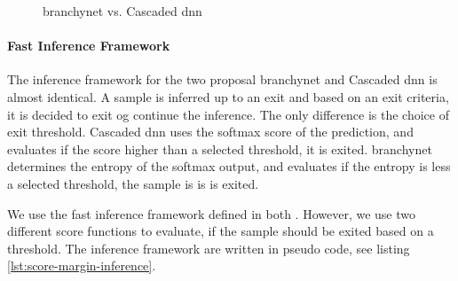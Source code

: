 \begin{figure}
	\hspace{2em}
	\caption[\gls{branchynet} vs. Cascaded \gls{dnn}]{\gls{branchynet} vs. Cascaded \gls{dnn}}
	\label{fig:cascaded-vs-branchy}
\end{figure}

\paragraph{Fast Inference Framework} The inference framework for the two proposal \gls{branchynet} and Cascaded \gls{dnn} is almost identical. A sample is inferred up to an exit and based on an exit criteria, it is decided to exit og continue the inference. The only difference is the choice of exit threshold. Cascaded \gls{dnn} uses the softmax score of the prediction, and evaluates if the score higher than a selected threshold, it is exited. \gls{branchynet} determines the entropy of the softmax output, and evaluates if the entropy is less a selected threshold, the sample is is is exited.

We use the fast inference framework defined in both \cite{leroux_resource-constrained_2015,teerapittayanon_branchynet:_2016}. However, we use two different score functions to evaluate, if the sample should be exited based on a threshold. The inference framework are written in pseudo code,  see listing \ref{lst:score-margin-inference}.

